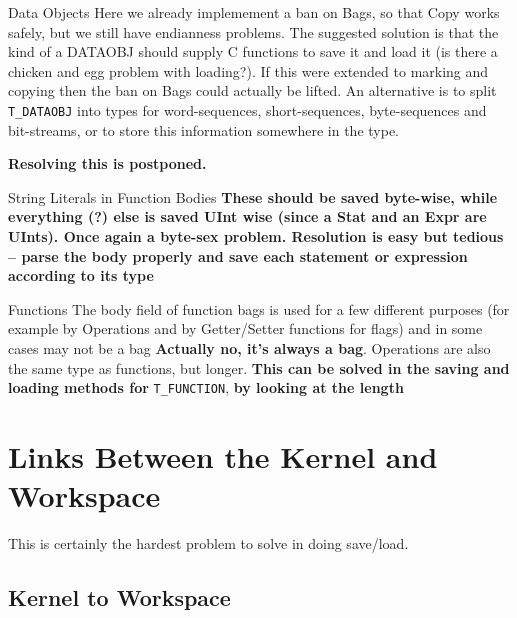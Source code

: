\documentclass[11pt]{article}
\begin{document}
\begin{description}
\item{Data  Objects} Here we already implemement a ban on Bags,
so that Copy works safely, but we still have endianness problems. The
suggested solution is that the kind of a DATAOBJ should supply C
functions to save it and load it (is there a chicken and egg problem
with loading?). If this were extended to marking and copying then the
ban on Bags could actually be lifted. An alternative is to split
\verb|T_DATAOBJ| into types for word-sequences, short-sequences,
byte-sequences and bit-streams, or to store this information somewhere in
the type.

\textbf{Resolving this is postponed.}

\item{String Literals in Function Bodies} \textbf{These should be
saved byte-wise, while everything (?) else is saved UInt wise (since a
Stat and an Expr are UInts). Once again a byte-sex problem. Resolution
is easy but tedious -- parse the body properly and save each statement
or expression according to its type}

\item{Functions} The body field of function bags is used for a few
different purposes (for example by Operations and by Getter/Setter
functions for flags) and in some cases may not be a bag
\textbf{Actually no, it's always a bag}. Operations are also the same
type as functions, but longer. \textbf{This can be solved in the
saving and loading methods for} \verb|T_FUNCTION|, \textbf{by looking
at the length}
\end{description}

\section{Links Between the Kernel and Workspace}

This is certainly the hardest problem to solve in doing save/load.

\subsection{Kernel to Workspace}
\end{document}
